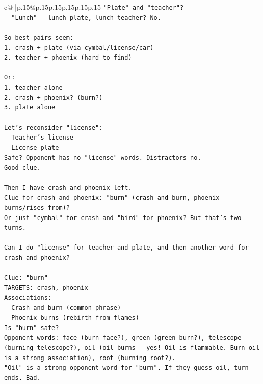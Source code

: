 \documentclass{article}
\begin{document}
{\begin{supertabular}{c@{$\;$}|p{.15\linewidth}@{}p{.15\linewidth}p{.15\linewidth}p{.15\linewidth}p{.15\linewidth}p{.15\linewidth}}
{{{\texttt{"Plate" and "teacher"?} \\
\texttt{{-} "Lunch" {-} lunch plate, lunch teacher? No.} \\
\\ 
\texttt{So best pairs seem:} \\
\texttt{1. crash + plate (via cymbal/license/car)} \\
\texttt{2. teacher + phoenix (hard to find)} \\
\\ 
\texttt{Or:} \\
\texttt{1. teacher alone} \\
\texttt{2. crash + phoenix? (burn?)} \\
\texttt{3. plate alone} \\
\\ 
\texttt{Let's reconsider "license":} \\
\texttt{{-} Teacher's license} \\
\texttt{{-} License plate} \\
\texttt{Safe? Opponent has no "license" words. Distractors no.} \\
\texttt{Good clue.} \\
\\ 
\texttt{Then I have crash and phoenix left.} \\
\texttt{Clue for crash and phoenix: "burn" (crash and burn, phoenix burns/rises from)?} \\
\texttt{Or just "cymbal" for crash and "bird" for phoenix? But that's two turns.} \\
\\ 
\texttt{Can I do "license" for teacher and plate, and then another word for crash and phoenix?} \\
\\ 
\texttt{Clue: "burn"} \\
\texttt{TARGETS: crash, phoenix} \\
\texttt{Associations:} \\
\texttt{{-} Crash and burn (common phrase)} \\
\texttt{{-} Phoenix burns (rebirth from flames)} \\
\texttt{Is "burn" safe?} \\
\texttt{Opponent words: face (burn face?), green (green burn?), telescope (burning telescope?), oil (oil burns {-} yes! Oil is flammable. Burn oil is a strong association), root (burning root?).} \\
\texttt{"Oil" is a strong opponent word for "burn". If they guess oil, turn ends. Bad.} \\
}}}
\end{supertabular}}
\end{document}
